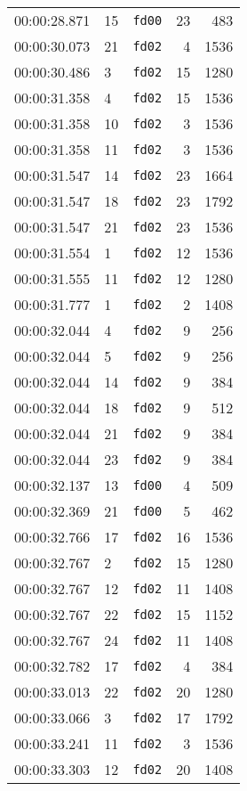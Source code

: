 \documentclass{article}
\begin{document}
\begin{longtable}{lllrr}
00:00:28.871 & 15 & \texttt{fd00} & 23 & 483 \\
00:00:30.073 & 21 & \texttt{fd02} & 4 & 1536 \\
00:00:30.486 & 3 & \texttt{fd02} & 15 & 1280 \\
00:00:31.358 & 4 & \texttt{fd02} & 15 & 1536 \\
00:00:31.358 & 10 & \texttt{fd02} & 3 & 1536 \\
00:00:31.358 & 11 & \texttt{fd02} & 3 & 1536 \\
00:00:31.547 & 14 & \texttt{fd02} & 23 & 1664 \\
00:00:31.547 & 18 & \texttt{fd02} & 23 & 1792 \\
00:00:31.547 & 21 & \texttt{fd02} & 23 & 1536 \\
00:00:31.554 & 1 & \texttt{fd02} & 12 & 1536 \\
00:00:31.555 & 11 & \texttt{fd02} & 12 & 1280 \\
00:00:31.777 & 1 & \texttt{fd02} & 2 & 1408 \\
00:00:32.044 & 4 & \texttt{fd02} & 9 & 256 \\
00:00:32.044 & 5 & \texttt{fd02} & 9 & 256 \\
00:00:32.044 & 14 & \texttt{fd02} & 9 & 384 \\
00:00:32.044 & 18 & \texttt{fd02} & 9 & 512 \\
00:00:32.044 & 21 & \texttt{fd02} & 9 & 384 \\
00:00:32.044 & 23 & \texttt{fd02} & 9 & 384 \\
00:00:32.137 & 13 & \texttt{fd00} & 4 & 509 \\
00:00:32.369 & 21 & \texttt{fd00} & 5 & 462 \\
00:00:32.766 & 17 & \texttt{fd02} & 16 & 1536 \\
00:00:32.767 & 2 & \texttt{fd02} & 15 & 1280 \\
00:00:32.767 & 12 & \texttt{fd02} & 11 & 1408 \\
00:00:32.767 & 22 & \texttt{fd02} & 15 & 1152 \\
00:00:32.767 & 24 & \texttt{fd02} & 11 & 1408 \\
00:00:32.782 & 17 & \texttt{fd02} & 4 & 384 \\
00:00:33.013 & 22 & \texttt{fd02} & 20 & 1280 \\
00:00:33.066 & 3 & \texttt{fd02} & 17 & 1792 \\
00:00:33.241 & 11 & \texttt{fd02} & 3 & 1536 \\
00:00:33.303 & 12 & \texttt{fd02} & 20 & 1408 \\

\end{longtable}
\end{document}
